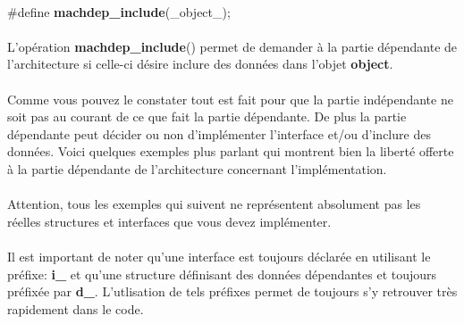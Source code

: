 \documentclass[10pt,a4wide]{article}
\begin{document}
\paragraph{}

\hspace{1.5cm}\#define \textbf{machdep\_include}(\_object\_);

\paragraph{}

L'op\'eration \textbf{machdep\_include}() permet de demander \`a la partie
d\'ependante de l'architecture si celle-ci d\'esire inclure des donn\'ees
dans l'objet \textbf{object}.

\paragraph{}

Comme vous pouvez le constater tout est fait pour que la partie ind\'ependante
ne soit pas au courant de ce que fait la partie d\'ependante. De plus
la partie d\'ependante peut d\'ecider ou non d'impl\'ementer l'interface
et/ou d'inclure des donn\'ees. Voici quelques exemples plus parlant
qui montrent bien la libert\'e offerte \`a la partie d\'ependante
de l'architecture concernant l'impl\'ementation.

\paragraph{}

Attention, tous les exemples qui suivent ne repr\'esentent absolument
pas les r\'eelles structures et interfaces que vous devez impl\'ementer.

\paragraph{}

Il est important de noter qu'une interface est toujours d\'eclar\'ee en
utilisant le pr\'efixe: \textbf{i\_} et qu'une structure d\'efinisant
des donn\'ees d\'ependantes et toujours pr\'efix\'ee par \textbf{d\_}.
L'utlisation de tels pr\'efixes permet de toujours s'y retrouver
tr\`es rapidement dans le code.

\paragraph{}
\end{document}
